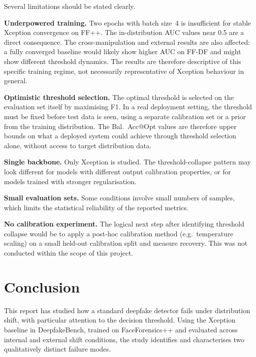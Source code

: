 \documentclass[a4paper,12pt]{report}
\begin{document}
Several limitations should be stated clearly.

\textbf{Underpowered training.}
Two epochs with batch size~4 is insufficient for stable
Xception convergence on FF++.
The in-distribution AUC values near 0.5 are a direct
consequence.
The cross-manipulation and external results are also
affected: a fully converged baseline would likely show
higher AUC on FF-DF and might show different threshold
dynamics.
The results are therefore descriptive of this specific
training regime, not necessarily representative of
Xception behaviour in general.

\textbf{Optimistic threshold selection.}
The optimal threshold is selected on the evaluation set
itself by maximising F1.
In a real deployment setting, the threshold must be
fixed before test data is seen, using a separate
calibration set or a prior from the training
distribution.
The Bal.~Acc@Opt values are therefore upper bounds on
what a deployed system could achieve through
threshold selection alone, without access to target
distribution data.

\textbf{Single backbone.}
Only Xception is studied.
The threshold-collapse pattern may look different for
models with different output calibration properties,
or for models trained with stronger regularisation.

\textbf{Small evaluation sets.}
Some conditions involve small numbers of samples,
which limits the statistical reliability of the
reported metrics.

\textbf{No calibration experiment.}
The logical next step after identifying threshold
collapse would be to apply a post-hoc calibration
method (e.g.\ temperature scaling) on a small
held-out calibration split and measure recovery.
This was not conducted within the scope of this project.

\chapter{Conclusion}

This report has studied how a standard deepfake detector
fails under distribution shift, with particular attention
to the decision threshold.
Using the Xception baseline in DeepfakeBench, trained on
FaceForensics++ and evaluated across internal and external
shift conditions, the study identifies and characterises
two qualitatively distinct failure modes.
\end{document}
